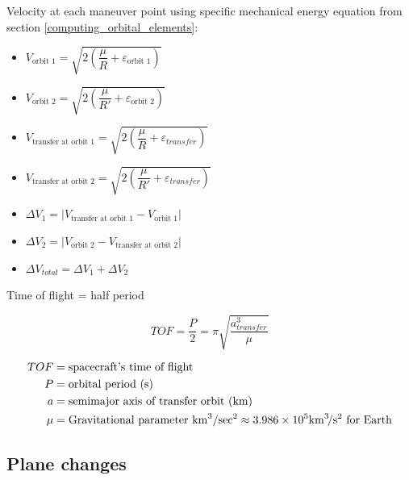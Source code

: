 \documentclass{article}
\newcommand{\myvarmukm}{\mu &= \text{Gravitational parameter \si{\kilo\meter\cubed\per\sec\squared}} \approx 3.986 \times 10^5 \si{\kilo\meter\cubed\per\second\squared} \text{ for Earth}}
\begin{document}
Velocity at each maneuver point using specific mechanical energy equation from section \ref{computing_orbital_elements}:

\begin{multicols}{2}
	\begin{itemize}
		\item $V_{\text{orbit 1}} = \sqrt{2\left(\dfrac{\mu}{R} + \varepsilon_{\text{orbit 1}}\right)}$
		\item $V_{\text{orbit 2}} = \sqrt{2\left(\dfrac{\mu}{R'} + \varepsilon_{\text{orbit 2}}\right)}$
		\item $V_{\text{transfer at orbit 1}} = \sqrt{2\left(\dfrac{\mu}{R} + \varepsilon_{transfer}\right)}$
		\item $V_{\text{transfer at orbit 2}} = \sqrt{2\left(\dfrac{\mu}{R'} + \varepsilon_{transfer}\right)}$
	\end{itemize}
	\vfill\null
	\columnbreak
	\begin{itemize}
		\item $\Delta V_1 = |V_{\text{transfer at orbit 1}} - V_{\text{orbit 1}}|$
		\item $\Delta V_2 = |V_{\text{orbit 2}} - V_{\text{transfer at orbit 2}}|$
		\item $\Delta V_{total} = \Delta V_1 + \Delta V_2$
	\end{itemize}
\end{multicols}

Time of flight = half period

\begin{multicols}{3}
	\begin{equation*}
	\boxed{TOF = \dfrac{P}{2} = \pi \sqrt{\dfrac{a_{transfer}^3}{\mu}}}
	\end{equation*}
	
	\vfill\null
	\columnbreak
	
	\begin{align*}
	TOF &= \text{spacecraft's time of flight}\\
	P &= \text{orbital period (\si{\second})}\\
	a &= \text{semimajor axis of transfer orbit (\si{\kilo\meter)}}\\
	\myvarmukm\\
	\end{align*}
\end{multicols}

\subsection{Plane changes}
\end{document}
